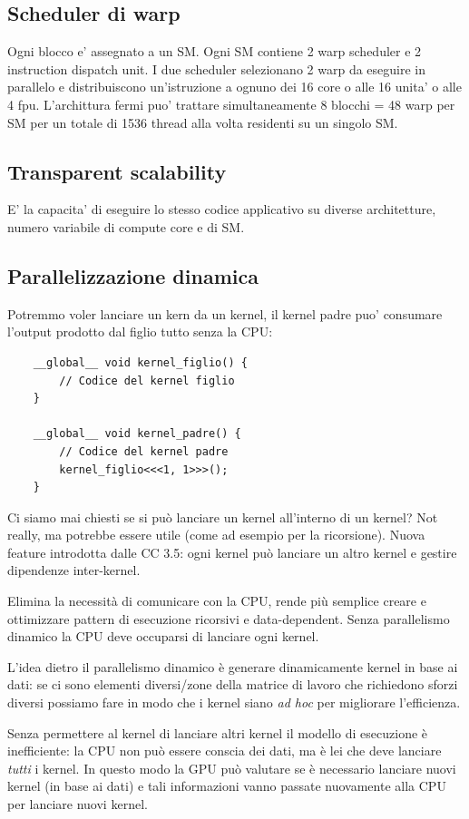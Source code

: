 \subsection{Scheduler di warp}
Ogni blocco e' assegnato a un SM. Ogni SM contiene 2 warp scheduler e 2 instruction dispatch unit. I due scheduler selezionano 2 warp da eseguire in parallelo e distribuiscono un'istruzione a ognuno dei 16 core o alle 16 unita' o alle 4 fpu. L'archittura fermi puo' trattare simultaneamente 8 blocchi = 48 warp per SM per un totale di 1536 thread alla volta residenti su un singolo SM.

\subsection{Transparent scalability}
E' la capacita' di eseguire lo stesso codice applicativo su diverse architetture, numero variabile di compute core e di SM.

\subsection{Parallelizzazione dinamica}
Potremmo voler lanciare un kern da un kernel, il kernel padre puo' consumare l'output prodotto dal figlio tutto senza la CPU:
\begin{lstlisting}
    __global__ void kernel_figlio() {
        // Codice del kernel figlio
    }

    __global__ void kernel_padre() {
        // Codice del kernel padre
        kernel_figlio<<<1, 1>>>();
    }
\end{lstlisting}

Ci siamo mai chiesti se si può lanciare un kernel all'interno di un kernel? Not really, ma potrebbe essere utile (come ad esempio per la ricorsione). Nuova feature introdotta dalle CC 3.5: ogni kernel può lanciare un altro kernel e gestire dipendenze inter-kernel. 

Elimina la necessità di comunicare con la CPU, rende più semplice creare e ottimizzare pattern di esecuzione ricorsivi e data-dependent. Senza parallelismo dinamico la CPU deve occuparsi di lanciare ogni kernel.

L'idea dietro il parallelismo dinamico è generare dinamicamente kernel in base ai dati: se ci sono elementi diversi/zone della matrice di lavoro che richiedono sforzi diversi possiamo fare in modo che i kernel siano \textit{ad hoc} per migliorare l'efficienza.

Senza permettere al kernel di lanciare altri kernel il modello di esecuzione è inefficiente: la CPU non può essere conscia dei dati, ma è lei che deve lanciare \textit{tutti} i kernel. In questo modo la GPU può valutare se è necessario lanciare nuovi kernel (in base ai dati) e tali informazioni vanno passate nuovamente alla CPU per lanciare nuovi kernel.

